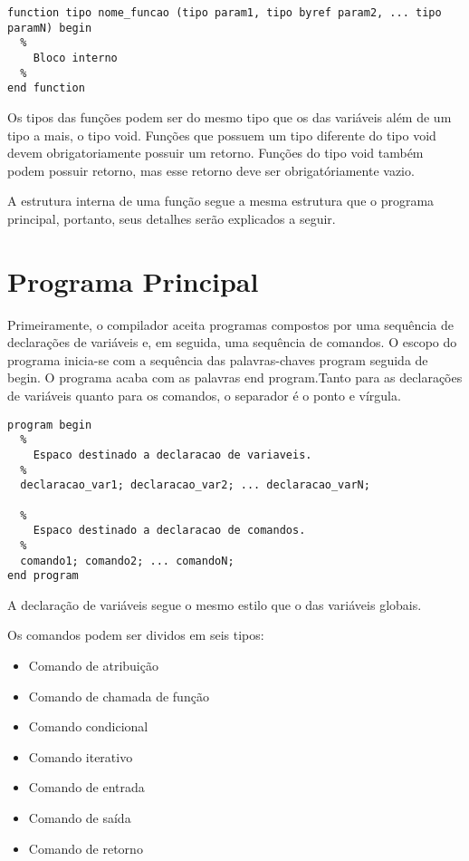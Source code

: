 \begin{lstlisting}
function tipo nome_funcao (tipo param1, tipo byref param2, ... tipo paramN) begin
  %
    Bloco interno
  %
end function
\end{lstlisting}

  Os tipos das funções podem ser do mesmo tipo que os das variáveis além de um tipo a mais, o tipo void. Funções que possuem um tipo diferente do tipo void devem obrigatoriamente possuir um retorno. Funções do tipo void também podem possuir retorno, mas esse retorno deve ser obrigatóriamente vazio.

  A estrutura interna de uma função segue a mesma estrutura que o programa principal, portanto, seus detalhes serão explicados a seguir.

  \section{Programa Principal}

  Primeiramente, o compilador aceita programas compostos por uma sequência de declarações de variáveis e, em seguida, uma sequência de comandos. O escopo do programa inicia-se com a sequência das palavras-chaves program seguida de begin. O programa acaba com as palavras end program.Tanto para as declarações de variáveis quanto para os comandos, o separador é o ponto e vírgula. 

\begin{lstlisting} 
program begin
  %
    Espaco destinado a declaracao de variaveis.
  %
  declaracao_var1; declaracao_var2; ... declaracao_varN;

  %
    Espaco destinado a declaracao de comandos.
  %
  comando1; comando2; ... comandoN; 
end program
\end{lstlisting}
          
  A declaração de variáveis segue o mesmo estilo que o das variáveis globais.

  Os comandos podem ser dividos em seis tipos:
  \begin{itemize}
    \item Comando de atribuição
    \item Comando de chamada de função
    \item Comando condicional
    \item Comando iterativo
    \item Comando de entrada
    \item Comando de saída
    \item Comando de retorno
  \end{itemize}

